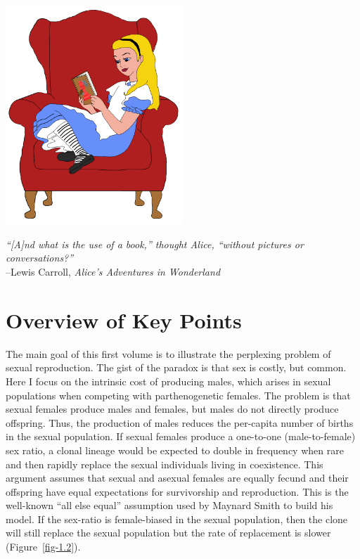 \documentclass[
  letterpaper,
]{book}
\begin{document}
\begin{center}
\includegraphics[width=0.5\textwidth,height=\textheight]{images/fig7-1.png}
\end{center}

\emph{``{[}A{]}nd what is the use of a book,'' thought Alice, ``without
pictures or conversations?''}\\
--Lewis Carroll, \emph{Alice's Adventures in Wonderland}

\section{Overview of Key Points}\label{overview-of-key-points}

The main goal of this first volume is to illustrate the perplexing
problem of sexual reproduction. The gist of the paradox is that sex is
costly, but common. Here I focus on the intrinsic cost of producing
males, which arises in sexual populations when competing with
parthenogenetic females. The problem is that sexual females produce
males and females, but males do not directly produce offspring. Thus,
the production of males reduces the per-capita number of births in the
sexual population. If sexual females produce a one-to-one
(male-to-female) sex ratio, a clonal lineage would be expected to double
in frequency when rare and then rapidly replace the sexual individuals
living in coexistence. This argument assumes that sexual and asexual
females are equally fecund and their offspring have equal expectations
for survivorship and reproduction. This is the well-known ``all else
equal'' assumption used by Maynard Smith to build his model. If the
sex-ratio is female-biased in the sexual population, then the clone will
still replace the sexual population but the rate of replacement is
slower (Figure~\ref{fig-1.2}).
\end{document}
